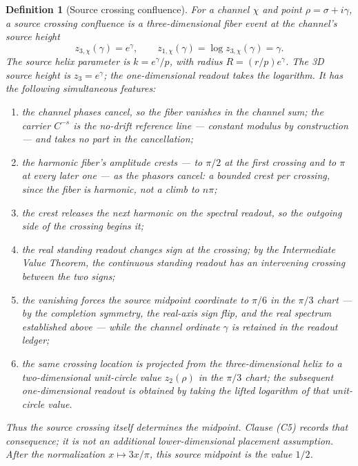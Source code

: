 \documentclass[11pt]{article}
\newtheorem{definition}{Definition}[section]
\begin{document}
\begin{definition}[Source crossing confluence]
For a channel $\chi$ and point $\rho=\sigma+i\gamma$, a source crossing
confluence is a three-dimensional fiber event at the channel's source
height
\[
  z_{3,\chi}(\gamma)=e^\gamma,
  \qquad
  z_{1,\chi}(\gamma)=\log z_{3,\chi}(\gamma)=\gamma .
\]
The source helix parameter is $k=e^\gamma/p$, with radius
$R=(r/p)e^\gamma$.  The 3D source height is $z_3=e^\gamma$; the
one-dimensional readout takes the logarithm.  It has the following simultaneous
features:
\begin{enumerate}[label=(C\arabic*)]
\item the channel phases cancel, so the fiber vanishes in the channel sum; the
  carrier $C^{-s}$ is the no-drift reference line --- constant modulus by
  construction --- and takes no part in the cancellation;
\item the harmonic fiber's amplitude crests --- to $\pi/2$ at the first crossing
  and to $\pi$ at every later one --- as the phasors cancel: a bounded crest per
  crossing, since the fiber is harmonic, not a climb to $n\pi$;
\item the crest releases the next harmonic on the spectral readout, so the
  outgoing side of the crossing begins it;
\item the real standing readout changes sign at the crossing; by the
  Intermediate Value Theorem, the continuous standing readout has an intervening
  crossing between the two signs;
\item the vanishing forces the source midpoint coordinate to $\pi/6$ in the
  $\pi/3$ chart --- by the completion symmetry, the real-axis sign flip, and the
  real spectrum established above --- while the channel ordinate $\gamma$ is
  retained in the readout ledger;
\item the same crossing location is projected from the three-dimensional helix
  to a two-dimensional unit-circle value $z_2(\rho)$ in the $\pi/3$ chart; the
  subsequent one-dimensional readout is obtained by taking the lifted logarithm
  of that unit-circle value.
\end{enumerate}
Thus the source crossing itself determines the midpoint.  Clause (C5) records
that consequence; it is not an additional lower-dimensional placement
assumption.  After the normalization $x\mapsto 3x/\pi$, this source midpoint is
the value $1/2$.
\end{definition}
\end{document}
